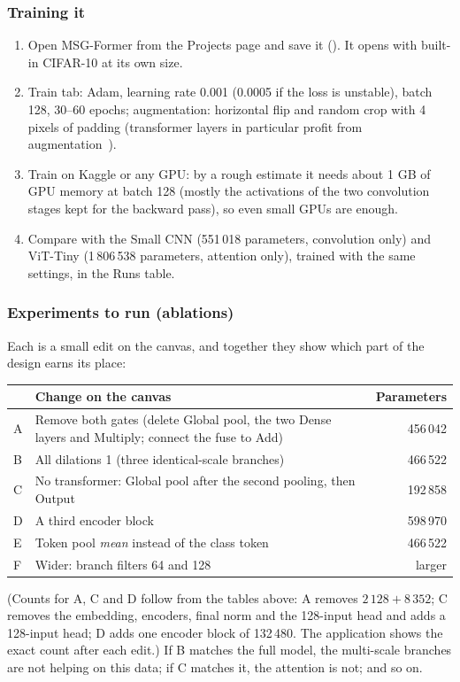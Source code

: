\documentclass[11pt,a4paper]{article}
\newcommand{\kbd}[1]{\mbox{\fboxsep=1.5pt\fbox{\footnotesize\texttt{#1}}}}
\begin{document}
\subsubsection{Training it}
\begin{enumerate}
  \item Open MSG-Former from the Projects page and save it (\kbd{Cmd+S}). It opens with built-in CIFAR-10 at its own size.
  \item Train tab: Adam, learning rate 0.001 (0.0005 if the loss is unstable), batch 128, 30--60 epochs; augmentation: horizontal flip
        and random crop with 4 pixels of padding (transformer layers in particular profit from augmentation~\cite{steiner2021howtotrain}).
  \item Train on Kaggle or any GPU: by a rough estimate it needs about 1 GB of GPU memory at batch 128 (mostly the activations of the two
        convolution stages kept for the backward pass), so even small GPUs are enough.
  \item Compare with the Small CNN (551\,018 parameters, convolution only) and ViT-Tiny (1\,806\,538 parameters, attention only), trained
        with the same settings, in the Runs table.
\end{enumerate}

\subsubsection{Experiments to run (ablations)}
Each is a small edit on the canvas, and together they show which part of the design earns its place:
\begin{center}
\begin{tabularx}{\linewidth}{@{}lXr@{}}
\toprule
& \textbf{Change on the canvas} & \textbf{Parameters}\\
\midrule
A & Remove both gates (delete Global pool, the two Dense layers and Multiply; connect the fuse to Add) & 456\,042\\
B & All dilations 1 (three identical-scale branches) & 466\,522\\
C & No transformer: Global pool after the second pooling, then Output & 192\,858\\
D & A third encoder block & 598\,970\\
E & Token pool \emph{mean} instead of the class token & 466\,522\\
F & Wider: branch filters 64 and 128 & larger\\
\bottomrule
\end{tabularx}
\end{center}
(Counts for A, C and D follow from the tables above: A removes $2\,128+8\,352$; C removes the embedding, encoders, final norm and the
128-input head and adds a 128-input head; D adds one encoder block of 132\,480. The application shows the exact count after each edit.)
If B matches the full model, the multi-scale branches are not helping on this data; if C matches it, the attention is not; and so on.
\end{document}
